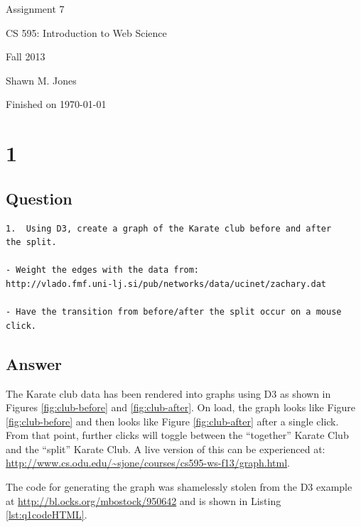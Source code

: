 \documentclass[letterpaper,11pt]{article}
\begin{document}
\begin{titlepage}

\begin{center}

\Huge{Assignment 7}

\Large{CS 595:  Introduction to Web Science}

\Large{Fall 2013}

\Large{Shawn M. Jones}

\Large Finished on \today

\end{center}

\end{titlepage}

\newpage
\section*{1}

\subsection*{Question}

\begin{verbatim}
1.  Using D3, create a graph of the Karate club before and after
the split.

- Weight the edges with the data from: 
http://vlado.fmf.uni-lj.si/pub/networks/data/ucinet/zachary.dat

- Have the transition from before/after the split occur on a mouse
click.
\end{verbatim}

\newpage
\subsection*{Answer}

The Karate club data has been rendered into graphs using D3 as shown in Figures \ref{fig:club-before} and \ref{fig:club-after}.  On load, the graph looks like Figure \ref{fig:club-before} and then looks like Figure \ref{fig:club-after} after a single click.  From that point, further clicks will toggle between the ``together'' Karate Club and the ``split'' Karate Club. A live version of this can be experienced at: \url{http://www.cs.odu.edu/~sjone/courses/cs595-ws-f13/graph.html}.

The code for generating the graph was shamelessly stolen from the D3 example at \url{http://bl.ocks.org/mbostock/950642} and is shown in Listing \ref{lst:q1codeHTML}.
\end{document}
